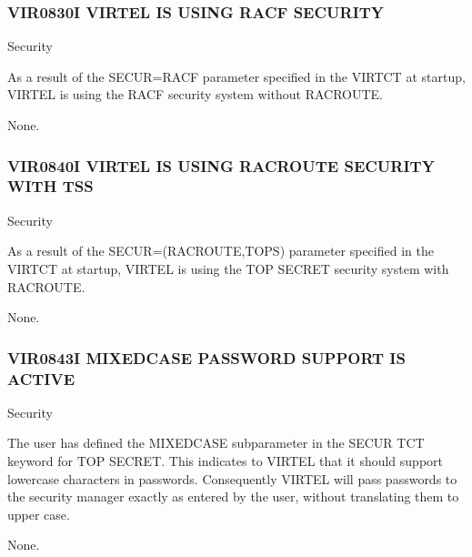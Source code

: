 \documentclass[letterpaper,10pt,english]{sphinxmanual}
\begin{document}
\subsubsection{VIR0830I VIRTEL IS USING RACF SECURITY}
\label{\detokenize{messages:vir0830i-virtel-is-using-racf-security}}\begin{description}
\sphinxAtStartPar
Security

\sphinxAtStartPar
As a result of the SECUR=RACF parameter specified in the VIRTCT at startup, VIRTEL is using the RACF security system without RACROUTE.

\sphinxAtStartPar
None.

\end{description}


\subsubsection{VIR0840I VIRTEL IS USING RACROUTE SECURITY WITH TSS}
\label{\detokenize{messages:vir0840i-virtel-is-using-racroute-security-with-tss}}\begin{description}
\sphinxAtStartPar
Security

\sphinxAtStartPar
As a result of the SECUR=(RACROUTE,TOPS) parameter specified in the VIRTCT at startup, VIRTEL is using the TOP SECRET security system with RACROUTE.

\sphinxAtStartPar
None.

\end{description}


\subsubsection{VIR0843I MIXED\sphinxhyphen{}CASE PASSWORD SUPPORT IS ACTIVE}
\label{\detokenize{messages:vir0843i-mixed-case-password-support-is-active}}\begin{description}
\sphinxAtStartPar
Security

\sphinxAtStartPar
The user has defined the MIXEDCASE subparameter in the SECUR TCT keyword for TOP SECRET. This indicates to VIRTEL that it should support lower\sphinxhyphen{}case characters in passwords. Consequently VIRTEL will pass passwords to the security manager exactly as entered by the user, without translating them to upper case.

\sphinxAtStartPar
None.

\end{description}
\end{document}
